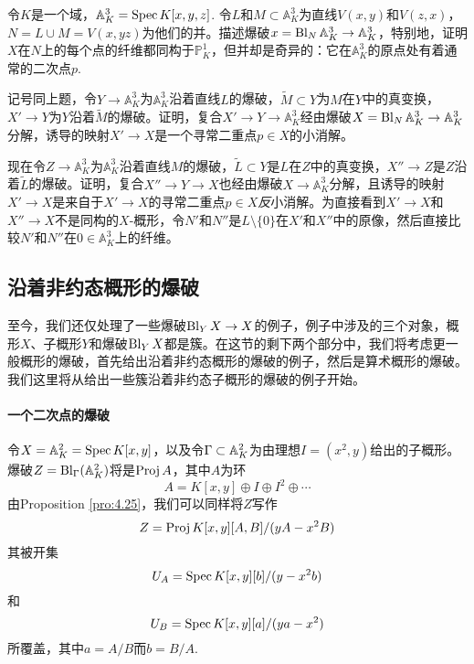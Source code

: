\begin{exe}\label{exe:4.37}
	令$K$是一个域，$\mathbb A_K^3=\operatorname{Spec} K[x,y,z]$. 令$L$和$M\subset \mathbb A_K^3$为直线$V(x,y)$和$V(z,x)$，$N=L\cup M=V(x,yz)$为他们的并。描述爆破$x=\operatorname{Bl}_N \mathbb A_K^3\to \mathbb A_K^3$，特别地，证明$X$在$N$上的每个点的纤维都同构于$\mathbb P_K^1$，但并却是奇异的：它在$\mathbb A_K^3$的原点处有着通常的二次点$p$.
\end{exe}


\begin{exe}\label{exe:4.38}
	记号同上题，令$Y\to \mathbb A_K^3$为$\mathbb A_K^3$沿着直线$L$的爆破，$\tilde M\subset Y$为$M$在$Y$中的真变换，$X'\to Y$为$Y$沿着$\tilde M$的爆破。证明，复合$X'\to Y\to \mathbb A_K^3$经由爆破$X=\operatorname{Bl}_N \mathbb A_K^3\to \mathbb A_K^3$分解，诱导的映射$X'\to X$是一个寻常二重点$p\in X$的小消解。
\end{exe}

\begin{exe}\label{exe:4.39}
	现在令$Z\to \mathbb A_K^3$为$\mathbb A_K^3$沿着直线$M$的爆破，$\tilde{L}\subset Y$是$L$在$Z$中的真变换，$X''\to Z$是$Z$沿着$\tilde L$的爆破。证明，复合$X''\to Y\to X$也经由爆破$X\to \mathbb A_K^3$分解，且诱导的映射$X'\to X$是来自于$X'\to X$的寻常二重点$p\in X$\textit{反}小消解。为直接看到$X'\to X$和$X''\to X$不是同构的$X$-概形，令$N'$和$N''$是$L\setminus \{0\}$在$X'$和$X''$中的原像，然后直接比较$N'$和$N''$在$0\in \mathbb A_K^3$上的纤维。
\end{exe}

\subsection{沿着非约态概形的爆破}\label{s:4.2.3}

至今，我们还仅处理了一些爆破$\operatorname{Bl}_Y X\to X$的例子，例子中涉及的三个对象，概形$X$、子概形$Y$和爆破$\operatorname{Bl}_YX$都是簇。在这节的剩下两个部分中，我们将考虑更一般概形的爆破，首先给出沿着非约态概形的爆破的例子，然后是算术概形的爆破。我们这里将从给出一些簇沿着非约态子概形的爆破的例子开始。

\paragraph*{一个二次点的爆破} 
令$X=\mathbb{A}_K^2=\operatorname{Spec} K[x,y]$，以及令$\Gamma\subset \mathbb{A}_K^2$为由理想$I=(x^2,y)$给出的子概形。爆破$Z=\operatorname{Bl}_\Gamma(\mathbb{A}_K^2)$将是$\operatorname{Proj} A$，其中$A$为环
\[
	A=K[x,y]\oplus I\oplus I^2\oplus \cdots
\]
由Proposition \ref{pro:4.25}，我们可以同样将$Z$写作
\[
	Z=\operatorname{Proj} K[x,y][A,B]/(yA-x^2B)
\]
其被开集
\[
	U_A=\operatorname{Spec} K[x,y][b]/(y-x^2b)
\]
和
\[
	U_B=\operatorname{Spec} K[x,y][a]/(ya-x^2)
\]
所覆盖，其中$a=A/B$而$b=B/A$.

